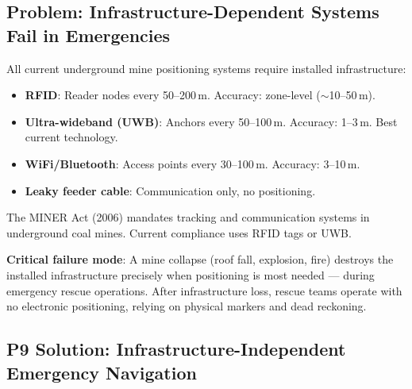 \documentclass[11pt]{article}
\theoremstyle{definition}
\theoremstyle{remark}
\begin{document}
\subsection{Problem: Infrastructure-Dependent Systems Fail in Emergencies}

All current underground mine positioning systems require installed
infrastructure:
\begin{itemize}[nosep]
\item \textbf{RFID}: Reader nodes every 50--200\,m. Accuracy: zone-level
  ($\sim$10--50\,m).
\item \textbf{Ultra-wideband (UWB)}: Anchors every 50--100\,m. Accuracy:
  1--3\,m. Best current technology.
\item \textbf{WiFi/Bluetooth}: Access points every 30--100\,m. Accuracy:
  3--10\,m.
\item \textbf{Leaky feeder cable}: Communication only, no positioning.
\end{itemize}

The MINER Act (2006) mandates tracking and communication systems in
underground coal mines. Current compliance uses RFID tags or UWB.

\textbf{Critical failure mode}: A mine collapse (roof fall, explosion,
fire) destroys the installed infrastructure precisely when positioning
is most needed --- during emergency rescue operations. After
infrastructure loss, rescue teams operate with no electronic positioning,
relying on physical markers and dead reckoning.

\subsection{P9 Solution: Infrastructure-Independent Emergency Navigation}
\end{document}

